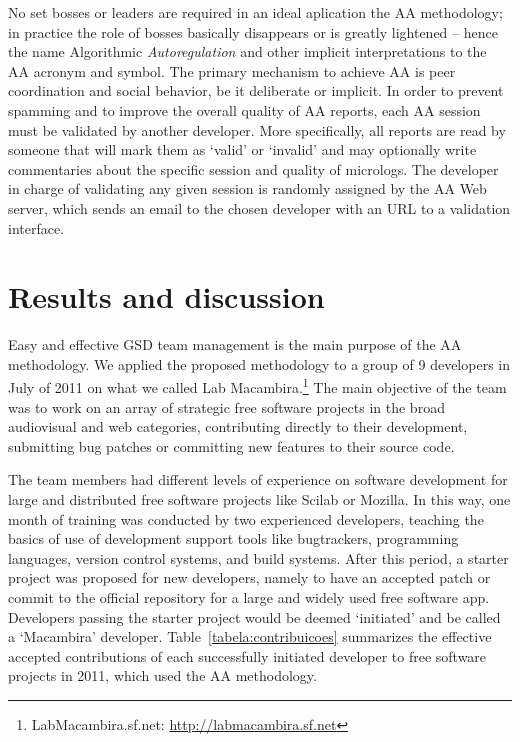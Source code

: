 \documentclass{article}
\begin{document}
No set bosses or leaders are required in an ideal aplication the AA methodology;
in practice the role of bosses basically disappears or is greatly lightened --
hence the name Algorithmic \emph{Autoregulation} and other implicit
interpretations to the AA acronym and symbol. The primary mechanism to achieve
AA is peer coordination and social behavior, be it deliberate or implicit. In
order to prevent spamming and to improve the overall quality of AA reports, each
AA session must be validated by another developer. More specifically, all
reports are read by someone that will mark them as `valid' or `invalid' and may
optionally write commentaries about the specific session and quality of
micrologs. The developer in charge of validating any given session is randomly
assigned by the AA Web server, which sends an email to the chosen developer with
an URL to a validation interface. 


\section{Results and discussion}
\label{results}

Easy and effective GSD team management is the main
purpose of the AA methodology. We applied the proposed methodology to a group
of 9 developers in July of 2011 on what we called Lab
Macambira.\footnote{LabMacambira.sf.net: \url{http://labmacambira.sf.net}} The
main objective of the team was to work on an array of strategic free software
projects in the broad audiovisual and web categories,
contributing directly to their development, submitting bug patches or
committing new features to their source code.

The team members had different levels of experience on software
development for large and distributed free software projects
like Scilab or Mozilla. In this way, one month of training was
conducted by two experienced developers, teaching the basics of use of
development support tools like bugtrackers, programming languages,
version control systems, and build systems. After this period, a starter project
was proposed for new developers, namely to have an accepted patch or commit to
the official repository for a large and widely used free software app.
Developers passing the starter project would be deemed `initiated' and be
called a `Macambira' developer.  Table~\ref{tabela:contribuicoes} summarizes the
effective accepted contributions of each successfully initiated developer to
free software projects in 2011, which used the AA methodology.
\end{document}
